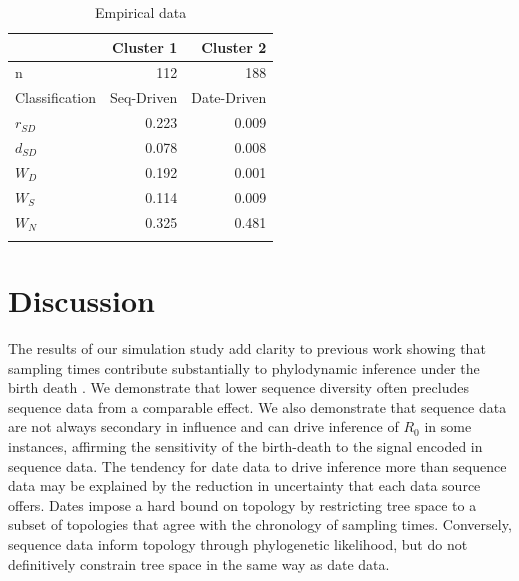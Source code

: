 \documentclass{article}
\begin{document}
\begin{table}[H]
\centering
\caption{Empirical data}
\begin{tabular}{lrr}
                    &   Cluster 1      &   Cluster 2     \\
\midrule
n                   &   112             &   188             \\
Classification      &   Seq-Driven       &   Date-Driven    \\
$r_{SD}$          &   0.223            &   0.009          \\
$d_{SD}$          &   0.078           &   0.008          \\
$W_{D}$             &   0.192            &   0.001          \\
$W_{S}$             &   0.114            &   0.009          \\
$W_{N}$             &   0.325            &   0.481          \\
\bottomrule 
\label{tab:tab2}
\end{tabular}
\end{table}
\section*{Discussion}
The results of our simulation study add clarity to previous work showing that sampling times contribute substantially to phylodynamic inference under the birth death \citep{volz_sampling_2014, Featherstone2021Infectious}. We demonstrate that lower sequence diversity often precludes sequence data from a comparable effect. We also demonstrate that sequence data are not always secondary in influence and can drive inference of $R_{0}$ in some instances, affirming the sensitivity of the birth-death to the signal encoded in sequence data. The tendency for date data to drive inference more than sequence data may be explained by the reduction in uncertainty that each data source offers. Dates impose a hard bound on topology by restricting tree space to a subset of topologies that agree with the chronology of sampling times. Conversely, sequence data inform topology through phylogenetic likelihood, but do not definitively constrain tree space in the same way as date data.
\end{document}

